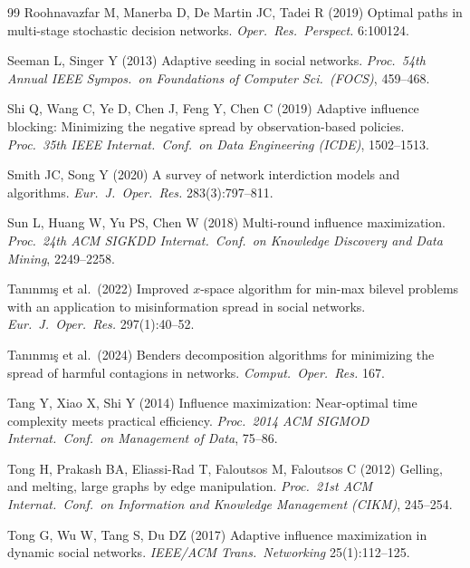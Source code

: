 \documentclass[11pt]{article}
\theoremstyle{definition}
\theoremstyle{remark}
\begin{document}
\begin{thebibliography}{99}
Roohnavazfar M, Manerba D, De Martin JC, Tadei R (2019) Optimal paths in
  multi-stage stochastic decision networks. \emph{Oper.\ Res.\ Perspect.}
  6:100124.

Seeman L, Singer Y (2013) Adaptive seeding in social networks.
  \emph{Proc.\ 54th Annual IEEE Sympos.\ on Foundations of Computer Sci.\
  (FOCS)}, 459--468.

Shi Q, Wang C, Ye D, Chen J, Feng Y, Chen C (2019) Adaptive influence
  blocking: Minimizing the negative spread by observation-based policies.
  \emph{Proc.\ 35th IEEE Internat.\ Conf.\ on Data Engineering (ICDE)},
  1502--1513.

Smith JC, Song Y (2020) A survey of network interdiction models and
  algorithms. \emph{Eur.\ J.\ Oper.\ Res.} 283(3):797--811.

Sun L, Huang W, Yu PS, Chen W (2018) Multi-round influence maximization.
  \emph{Proc.\ 24th ACM SIGKDD Internat.\ Conf.\ on Knowledge Discovery and Data
  Mining}, 2249--2258.

Tan{\i}nm{\i}{\c s} et al.\ (2022) Improved $x$-space algorithm for min-max
  bilevel problems with an application to misinformation spread in social
  networks. \emph{Eur.\ J.\ Oper.\ Res.} 297(1):40--52.

Tan{\i}nm{\i}{\c s} et al.\ (2024) Benders decomposition algorithms for
  minimizing the spread of harmful contagions in networks. \emph{Comput.\
  Oper.\ Res.} 167.

Tang Y, Xiao X, Shi Y (2014) Influence maximization: Near-optimal time
  complexity meets practical efficiency. \emph{Proc.\ 2014 ACM SIGMOD Internat.\
  Conf.\ on Management of Data}, 75--86.

\bibitem[{Tong et~al.(2012)}]{tong2012}
Tong H, Prakash BA, Eliassi-Rad T, Faloutsos M, Faloutsos C (2012) Gelling,
  and melting, large graphs by edge manipulation. \emph{Proc.\ 21st ACM
  Internat.\ Conf.\ on Information and Knowledge Management (CIKM)}, 245--254.

\bibitem[{Tong et~al.(2017)}]{tong2017}
Tong G, Wu W, Tang S, Du DZ (2017) Adaptive influence maximization in
  dynamic social networks. \emph{IEEE/ACM Trans.\ Networking} 25(1):112--125.


\end{thebibliography}
\end{document}
